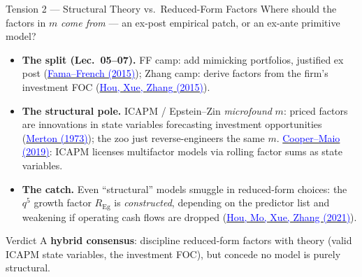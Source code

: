 \documentclass{beamer}
\begin{document}
\begin{frame}{Tension 2 --- Structural Theory vs.\ Reduced-Form Factors}
\small
Where should the factors in $m$ \emph{come from} --- an ex-post empirical patch, or an ex-ante primitive model?
\begin{itemize}
  \item \textbf{The split (Lec.\ 05--07).} FF camp: add mimicking portfolios, justified ex post (\href{https://doi.org/10.1016/j.jfineco.2014.10.010}{\textcolor{blue}{Fama--French (2015)}}); Zhang camp: derive factors from the firm's investment FOC (\href{https://doi.org/10.1093/rfs/hhu068}{\textcolor{blue}{Hou, Xue, Zhang (2015)}}).
  \item \textbf{The structural pole.} ICAPM / Epstein--Zin \emph{microfound} $m$: priced factors are innovations in state variables forecasting investment opportunities (\href{https://doi.org/10.2307/1913811}{\textcolor{blue}{Merton (1973)}}); the zoo just reverse-engineers the same $m$. \href{https://doi.org/10.1017/S0022109018001606}{\textcolor{blue}{Cooper--Maio (2019)}}: ICAPM licenses multifactor models via rolling factor sums as state variables.
  \item \textbf{The catch.} Even ``structural'' models smuggle in reduced-form choices: the $q^5$ growth factor $R_{\mathrm{Eg}}$ is \emph{constructed}, depending on the predictor list and weakening if operating cash flows are dropped (\href{https://doi.org/10.1093/rof/rfaa004}{\textcolor{blue}{Hou, Mo, Xue, Zhang (2021)}}).
\end{itemize}
\begin{block}{Verdict}
A \textbf{hybrid consensus}: discipline reduced-form factors with theory (valid ICAPM state variables, the investment FOC), but concede no model is purely structural.
\end{block}
\end{frame}
\end{document}
